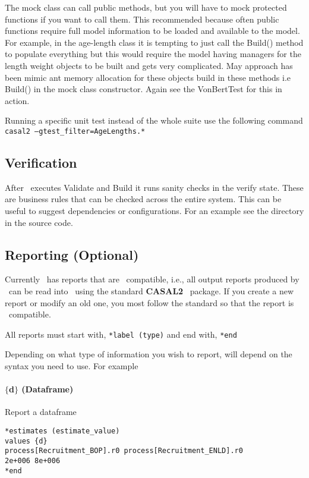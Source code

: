 The mock class can call public methods, but you will have to mock protected functions if you want to call them. This recommended because often public functions require full model information to be loaded and available to the model. For example, in the age-length class it is tempting to just call the Build() method to populate everything but this would require the model having managers for the length weight objects to be built and gets very complicated. May approach has been mimic ant memory allocation for these objects build in these methods i.e Build() in the mock class constructor. Again see the VonBertTest for this in action.

Running a specific unit test instead of the whole suite use the following command \texttt{casal2 --gtest\_filter=AgeLengths.*}

\subsection{Verification}
After \CNAME\ executes Validate and Build it runs sanity checks in the verify state. These are business rules that can be checked across the entire system. This can be useful to suggest dependencies or configurations. For an example see the directory  in the source code. 

\subsection{Reporting (Optional)}

Currently \CNAME\ has reports that are \R\ compatible, i.e., all output reports produced by \CNAME\ can be read into \R\ using the standard  \textbf{CASAL2} \R\ package. If you create a new report or modify an old one, you most follow the standard so that the report is \R\ compatible.

All reports must start with,
\texttt{*label (type)}
and end with,
\texttt{*end}

Depending on what type of information you wish to report, will depend on the syntax you need to use. For example

\paragraph*{$\{$d$\}$ (Dataframe)}
Report a dataframe
{\small{\begin{verbatim}
*estimates (estimate_value)
values {d}
process[Recruitment_BOP].r0 process[Recruitment_ENLD].r0 
2e+006 8e+006
*end
\end{verbatim}}}

